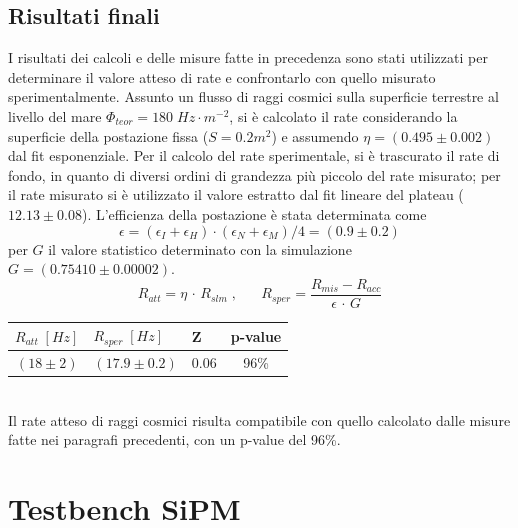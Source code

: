 \documentclass[11pt]{article} %
\begin{document}
\subsection*{Risultati finali}
I risultati dei calcoli e delle misure fatte in precedenza sono stati utilizzati per determinare il valore atteso di rate e confrontarlo con quello misurato sperimentalmente. Assunto un flusso di raggi cosmici sulla superficie terrestre al livello del mare $\Phi_{teor}=180\;Hz\cdot m^{-2}$, si è calcolato il rate considerando la superficie della postazione fissa ($S=0.2 m^2$) e assumendo $\eta=\left(0.495\pm0.002\right)$ dal fit esponenziale. Per il calcolo del rate sperimentale, si è trascurato il rate di fondo, in quanto di diversi ordini di grandezza più piccolo del rate misurato; per il rate misurato si è utilizzato il valore estratto dal fit lineare del plateau ($12.13\pm 0.08$). L'efficienza della postazione è stata determinata come 
\begin{equation}
\epsilon = \left(\epsilon_I + \epsilon_H\right)\cdot\left(\epsilon_N+\epsilon_M\right)/4 = \left(0.9\pm0.2\right)
\end{equation}
per $G$ il valore statistico determinato con la simulazione $G=\left(0.75410\pm0.00002\right)$.
\begin{equation}
R_{att}= \eta\,\cdot\,R_{slm}\;,\;\;\;\;\;\;R_{sper}=\frac{R_{mis}-R_{acc}}{\epsilon \,\cdot\,G}
\end{equation}
\begin{table}[!h]
\begin{center}
\begin{tabular}{|c|c|c|c|}
\hline
\multicolumn{1}{|l|}{$R_{att}\;\left[Hz\right]$} & \multicolumn{1}{l|}{$R_{sper}\;\left[Hz\right]$} & \multicolumn{1}{l|}{Z} & p-value \\ \hline
$\left(18\pm2\right)$ & $\left(17.9\pm0.2\right)$& 0.06& 96\%\\ \hline
\end{tabular}
\end{center}
\end{table}
\\Il rate atteso di raggi cosmici risulta compatibile con quello calcolato dalle misure fatte nei paragrafi precedenti, con un p-value del 96\%.
\newpage
\section{Testbench SiPM} 
\end{document}
